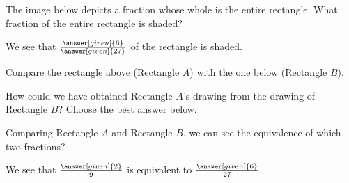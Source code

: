 \documentclass[nooutcomes]{ximera}
\begin{document}
\begin{problem}
The image below depicts a fraction whose whole is the entire rectangle.  What fraction of the entire rectangle is shaded?
\begin{center} \end{center}

\begin{prompt}
We see that $\frac{\answer[given]{6}}{\answer[given]{27}}$ of the rectangle is shaded.
\end{prompt}

\begin{problem}
Compare the rectangle above (Rectangle $A$) with the one below (Rectangle $B$).  
\begin{center} \end{center}

How could we have obtained Rectangle $A$'s drawing from the drawing of Rectangle $B$?  Choose the best answer below.
\begin{multipleChoice}
\end{multipleChoice}


\begin{problem}
 Comparing Rectangle $A$ and Rectangle $B$, we can see the equivalence of which two fractions?
 
 \begin{prompt}
 We see that $\frac{\answer[given]{2}}{9}$ is equivalent to $\frac{\answer[given]{6}}{27}$.
 \end{prompt}
 

\end{problem}
\end{problem}
\end{problem}
\end{document}
